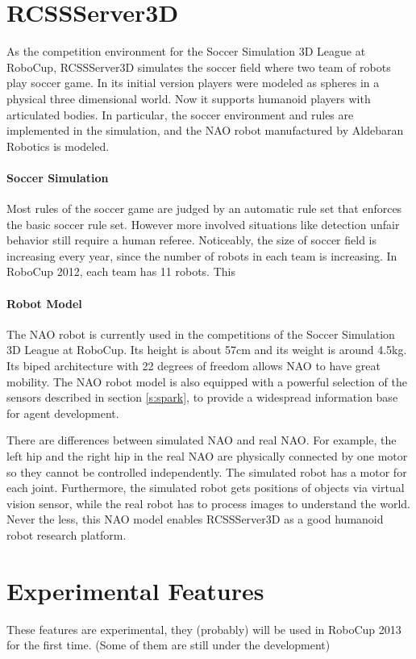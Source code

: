 \documentclass{llncs}
\begin{document}
\section{RCSSServer3D}
\label{s:rcssserver3d}

As the competition environment for the Soccer Simulation 3D League at RoboCup, 
RCSSServer3D simulates the soccer field where two team of robots play soccer game.
In its initial version players were modeled as spheres in a physical three dimensional world. Now it supports humanoid players with articulated bodies. In particular,  the soccer environment and rules are implemented in the simulation, and the NAO robot manufactured by Aldebaran Robotics is modeled.

\paragraph{Soccer Simulation}
Most rules of the soccer game are judged by an automatic rule set that enforces the basic soccer rule set.
However more involved situations like detection unfair behavior still require a human referee.
Noticeably, the size of soccer field is increasing every year, since the number of robots in each team is increasing. In RoboCup 2012, each team has 11 robots. This 


\paragraph{Robot Model}
The NAO robot is currently used in the competitions of the Soccer Simulation 3D League at RoboCup. Its height is about 57cm and its weight is around 4.5kg.
Its biped architecture with 22 degrees of freedom allows NAO to have great mobility.
The NAO robot model is also equipped with a powerful selection of the
sensors described in section \ref{s:spark}, to provide a widespread information base for
agent development.

There are differences between simulated NAO and real NAO. For example, the left hip and the right hip in the real NAO are physically connected by one motor so they cannot be controlled independently. The simulated robot has a motor for each joint. Furthermore, the simulated robot gets positions of objects via virtual vision sensor, while the real robot has to process images to understand the world. Never the less, this NAO model enables RCSSServer3D as a good humanoid robot research platform.


\section{Experimental Features}
\label{s:ongoing}
These features are experimental, they (probably) will be used in RoboCup 2013 for the first time. (Some of them are still under the development)
\end{document}
